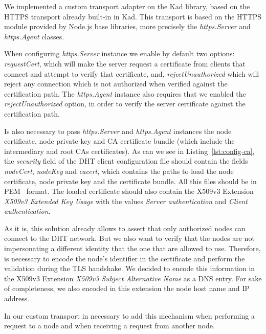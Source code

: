 We implemented a custom transport adapter on the Kad library, based on the HTTPS transport already built-in in Kad.
This transport is based on the HTTPS module provided by Node.js base libraries, more precisely the \textit{https.Server} and \textit{https.Agent} classes.

When configuring \textit{https.Server} instance we enable by default two options: \textit{requestCert}, which will make the server request a certificate from clients that connect and attempt to verify that certificate, and, \textit{rejectUnauthorized} which will reject any connection which is not authorized when verified against the certification path.
The \textit{https.Agent} instance also requires that we enabled the \textit{rejectUnauthorized} option, in order to verify the server certificate against the certification path.

Is also necessary to pass \textit{https.Server} and \textit{https.Agent} instances the node certificate, node private key and CA certificate bundle (which include the intermediary and root CAs certificates).
As can we see in Listing~\ref{lst:config-ca}, the \textit{security} field of the DHT client configuration file should contain the fields \textit{nodeCert}, \textit{nodeKey} and \textit{cacert}, which contains the paths to load the node certificate, node private key and the certificate bundle.
All this files should be in \ac{PEM}~\cite{rfc1421} format.
The loaded certificate should also contain the X509v3 Extension \textit{X509v3 Extended Key Usage} with the values \textit{Server authentication} and \textit{Client authentication}.



As it is, this solution already allows to assert that only authorized nodes can connect to the DHT network.
But we also want to verify that the nodes are not impersonating a different identity that the one that are allowed to use.
Therefore, is necessary to encode the node's identifier in the certificate and perform the validation during the TLS handshake.
We decided to encode this information in the X509v3 Extension \textit{X509v3 Subject Alternative Name} as a DNS entry.
For sake of completeness, we also encoded in this extension the node host name and IP address.

In our custom transport in necessary to add this mechanism when performing a request to a node and when receiving a request from another node.

